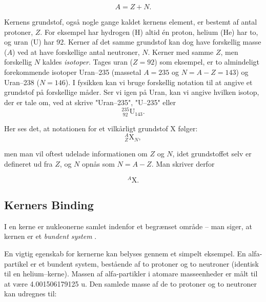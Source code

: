\begin{equation}
A = Z + N.
\label{eq:A}
\end{equation}  

Kernens grundstof, også nogle gange kaldet kernens element, er bestemt af antal protoner, $Z$. For eksempel har hydrogen (H) altid én proton, helium (He) har to, og uran (U) har 92.
Kerner af det samme grundstof kan dog have forskellig masse ($A$) ved at have forskellige antal neutroner, $N$. Kerner med samme $Z$, men forskellig $N$ kaldes \emph{isotoper}. Tages uran ($Z=92$) som eksempel, er to almindeligt forekommende isotoper Uran--235 (massetal $A=235$ og $N=A-Z=143$) og Uran--238 ($N=146$). I fysikken kan vi bruge forskellig notation til at angive et grundstof på forskellige måder. Ser vi igen på Uran, kan vi angive hvilken isotop, der er tale om, ved at skrive "Uran--235", "U--235" eller 
\begin{equation*}
^{235}_{~92}\text{U}_{143}.
\end{equation*}

Her ses det, at notationen for et vilkårligt grundstof X følger:
\begin{equation*}
^{A}_{Z}\text{X}_{N},
\end{equation*}

men man vil oftest udelade informationen om $Z$ og $N$, idet grundstoffet selv er defineret ud fra $Z$, og $N$ opnås som $N=A-Z$. Man skriver derfor

\begin{equation}
^{A}\text{X}.
\end{equation}

\subsection{Kerners Binding}
I en kerne er nukleonerne samlet indenfor et begrænset område -- man siger, at kernen er et \emph{bundent system} \footnotemark .


En vigtig egenskab for kernerne kan belyses gennem et simpelt eksempel. En alfa-partikel er et bundent system, bestående af to protoner og to neutroner (identisk til en helium--kerne). Massen af alfa-partikler i atomare masseenheder er målt til at være 4.001506179125 u. Den samlede masse af de to protoner og to neutroner kan udregnes til:

